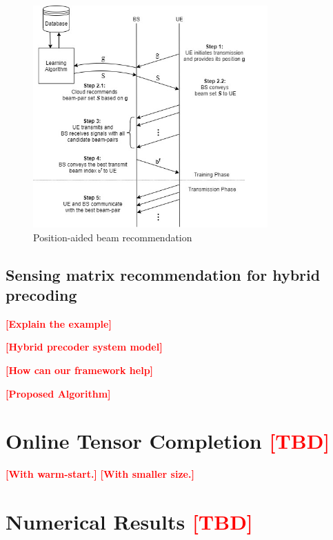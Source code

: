 \documentclass[12pt, draftcls, onecolumn]{IEEEtran}
\theoremstyle{plain}
\theoremstyle{definition}
\theoremstyle{remark}
\newcommand{\nt}[1]{\textcolor{red}{\textbf{[#1]}}}
\begin{document}
\begin{figure}
	\centering
	\includegraphics[width=9cm]{Journal_UL_MIMO_BF_recommendation.jpg}
	\caption{Position-aided beam recommendation}
	\label{fig:Beam_recomm_flow}
\end{figure}

\subsection{Sensing matrix recommendation for hybrid precoding}
\nt{Explain the example}

\nt{Hybrid precoder system model}

\nt{How can our framework help}

\nt{Proposed Algorithm}

\section{Online Tensor Completion \nt{TBD}} 
\nt{With warm-start.} \nt{With smaller size.}
\section{Numerical Results \nt{TBD}}
\end{document}
